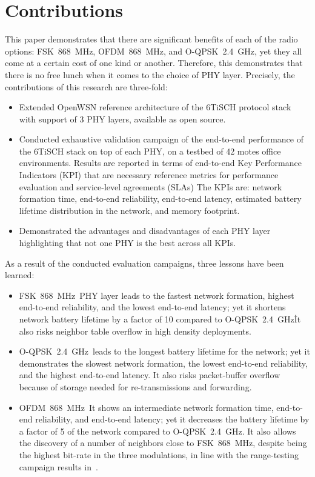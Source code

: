 \documentclass[journal]{IEEEtran}
\newcommand{\fsk}          {FSK~868~MHz}
\newcommand{\oqpsk}        {O-QPSK~2.4~GHz}
\newcommand{\ofdm}         {OFDM~868~MHz}
\begin{document}
\section{Contributions}
\label{sec:contributions}

This paper demonstrates that there are significant benefits of each of the radio options: \fsk, \ofdm, and \oqpsk, yet they all come at a certain cost of one kind or another.
Therefore, this demonstrates that there is no free lunch when it comes to the choice of PHY layer.
Precisely, the contributions of this research are three-fold:

\begin{itemize}
    \item Extended OpenWSN reference architecture of the 6TiSCH protocol stack with support of 3 PHY layers, available as open source.
    \item Conducted exhaustive validation campaign of the end-to-end performance of the 6TiSCH stack on top of each PHY, on a testbed of 42 motes office environments.
        Results are reported in terms of end-to-end Key Performance Indicators (KPI) that are necessary reference metrics for performance evaluation and service-level agreements (SLAs)
        The KPIs are: 
            network formation time,
            end-to-end reliability,
            end-to-end latency, 
            estimated battery lifetime distribution in the network, and
            memory footprint.
    \item Demonstrated the advantages and disadvantages of each PHY layer highlighting that not one PHY is the best across all KPIs.
\end{itemize}

As a result of the conducted evaluation campaigns, three lessons have been learned:


\begin{itemize}
    \item \fsk\ PHY layer leads to the fastest network formation, highest end-to-end reliability, and the lowest end-to-end latency; yet it shortens network battery lifetime by a factor of 10 compared to \oqpsk\. 
        It also risks neighbor table overflow in high density deployments.
    \item \oqpsk\ leads to the longest battery lifetime for the network; yet it demonstrates the slowest network formation, the lowest end-to-end reliability, and the highest end-to-end latency.
        It also risks packet-buffer overflow because of storage needed for re-transmissions and forwarding.
    \item \ofdm\ It shows an intermediate network formation time, end-to-end reliability, and end-to-end latency; yet  it decreases the battery lifetime by a factor of 5 of the network compared to \oqpsk.
    It also allows the discovery of a number of neighbors close to \fsk, despite being the highest bit-rate in the three modulations, in line with the range-testing campaign results in~\cite{munoz18evaluationa}. 
\end{itemize}
\end{document}
